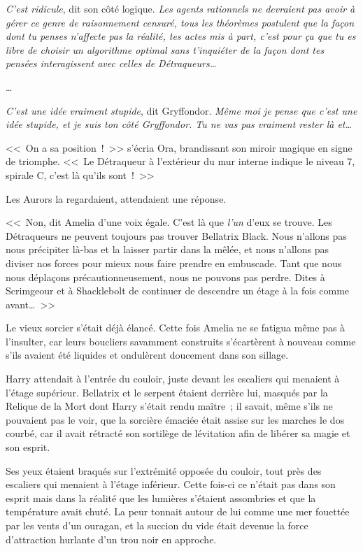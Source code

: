 \emph{C'est ridicule}, dit son côté logique. \emph{Les agents rationnels ne devraient pas avoir à gérer ce genre de raisonnement censuré, tous les théorèmes postulent que la façon dont tu penses n'affecte pas la réalité, tes actes mis à part, c'est pour ça que tu es libre de choisir un algorithme optimal sans t'inquiéter de la façon dont tes pensées interagissent avec celles de Détraqueurs…}

…

\emph{C'est une idée vraiment stupide}, dit Gryffondor. \emph{Même moi je pense que c'est une idée stupide, et je suis ton côté Gryffondor. Tu ne vas pas vraiment rester là et…}

\later

<<~On a sa position~!~>> s'écria Ora, brandissant son miroir magique en signe de triomphe. <<~Le Détraqueur à l'extérieur du mur interne indique le niveau 7, spirale C, c'est là qu'ils sont~!~>>

Les Aurors la regardaient, attendaient une réponse.

<<~Non, dit Amelia d'une voix égale. C'est là que \emph{l'un} d'eux se trouve. Les Détraqueurs ne peuvent toujours pas trouver Bellatrix Black. Nous n'allons pas nous précipiter là-bas et la laisser partir dans la mêlée, et nous n'allons pas diviser nos forces pour mieux nous faire prendre en embuscade. Tant que nous nous déplaçons précautionneusement, nous ne pouvons pas perdre. Dites à Scrimgeour et à Shacklebolt de continuer de descendre un étage à la fois comme avant…~>>

Le vieux sorcier s'était déjà élancé. Cette fois Amelia ne se fatigua même pas à l'insulter, car leurs boucliers savamment construits s'écartèrent à nouveau comme s'ils avaient été liquides et ondulèrent doucement dans son sillage.

\later

Harry attendait à l'entrée du couloir, juste devant les escaliers qui menaient à l'étage supérieur. Bellatrix et le serpent étaient derrière lui, masqués par la Relique de la Mort dont Harry s'était rendu maître~; il savait, même s'ils ne pouvaient pas le voir, que la sorcière émaciée était assise sur les marches le dos courbé, car il avait rétracté son sortilège de lévitation afin de libérer sa magie et son esprit.

Ses yeux étaient braqués sur l'extrémité opposée du couloir, tout près des escaliers qui menaient à l'étage inférieur. Cette fois-ci ce n'était pas dans son esprit mais dans la réalité que les lumières s'étaient assombries et que la température avait chuté. La peur tonnait autour de lui comme une mer fouettée par les vents d'un ouragan, et la succion du vide était devenue la force d'attraction hurlante d'un trou noir en approche.

